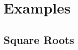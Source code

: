 \documentclass[dvipsnames]{beamer}
\theoremstyle{plain}
\begin{document}
\section{Examples}

% 
% 
% 
% 
% 
% 

\subsection{Square Roots}

\lstset{deletekeywords=sqrt}
\end{document}
